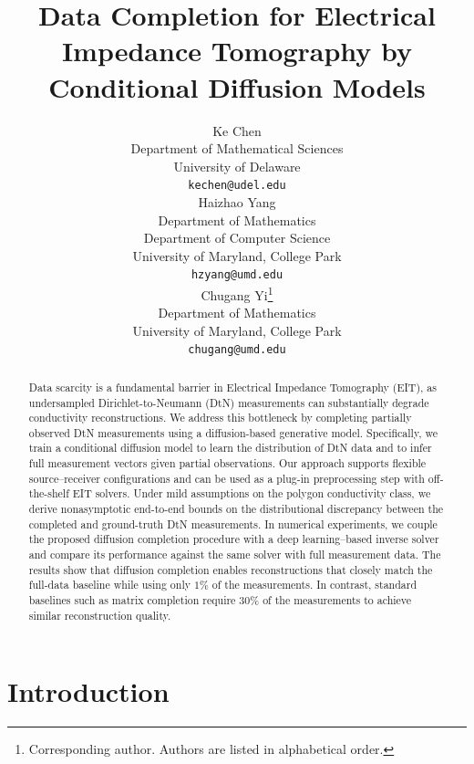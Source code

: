 \documentclass{article}
\title{Data Completion for Electrical Impedance Tomography by Conditional Diffusion Models}
\author{Ke Chen \\
Department of Mathematical Sciences\\
University of Delaware\\
\texttt{kechen@udel.edu}\\
\And
Haizhao Yang \\
Department of Mathematics\\
Department of Computer Science\\
University of Maryland, College Park \\
\texttt{hzyang@umd.edu} \\
\And
Chugang Yi\thanks{ Corresponding author. Authors are listed in alphabetical order.} \\
Department of Mathematics \\
University of Maryland, College Park \\
\texttt{chugang@umd.edu} \\
}
\begin{document}
\maketitle
\begin{abstract}
Data scarcity is a fundamental barrier in Electrical Impedance Tomography (EIT), as undersampled Dirichlet-to-Neumann (DtN) measurements can substantially degrade conductivity reconstructions. We address this bottleneck by completing partially observed DtN measurements using a diffusion-based generative model. Specifically, we train a conditional diffusion model to learn the distribution of DtN data and to infer full measurement vectors given partial observations. Our approach supports flexible source–receiver configurations and can be used as a plug-in preprocessing step with off-the-shelf EIT solvers. Under mild assumptions on the polygon conductivity class, we derive nonasymptotic end-to-end bounds on the distributional discrepancy between the completed and ground-truth DtN measurements. In numerical experiments, we couple the proposed diffusion  completion procedure with a deep learning–based inverse solver and compare its performance against the same solver with full measurement data. The results show that diffusion completion enables reconstructions that closely match the full-data baseline while using only $1\%$ of the measurements. In contrast, standard baselines such as matrix completion require $30\%$ of the measurements to achieve similar reconstruction quality.
\end{abstract}



\section{Introduction}
\end{document}
